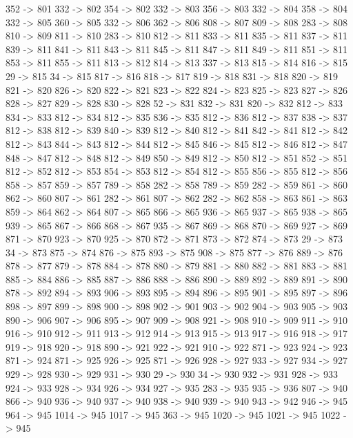 {	352 -> 801
	332 -> 802
	354 -> 802
	332 -> 803
	356 -> 803
	332 -> 804
	358 -> 804
	332 -> 805
	360 -> 805
	332 -> 806
	362 -> 806
	808 -> 807
	809 -> 808
	283 -> 808
	810 -> 809
	811 -> 810
	283 -> 810
	812 -> 811
	833 -> 811
	835 -> 811
	837 -> 811
	839 -> 811
	841 -> 811
	843 -> 811
	845 -> 811
	847 -> 811
	849 -> 811
	851 -> 811
	853 -> 811
	855 -> 811
	813 -> 812
	814 -> 813
	337 -> 813
	815 -> 814
	816 -> 815
	29 -> 815
	34 -> 815
	817 -> 816
	818 -> 817
	819 -> 818
	831 -> 818
	820 -> 819
	821 -> 820
	826 -> 820
	822 -> 821
	823 -> 822
	824 -> 823
	825 -> 823
	827 -> 826
	828 -> 827
	829 -> 828
	830 -> 828
	52 -> 831
	832 -> 831
	820 -> 832
	812 -> 833
	834 -> 833
	812 -> 834
	812 -> 835
	836 -> 835
	812 -> 836
	812 -> 837
	838 -> 837
	812 -> 838
	812 -> 839
	840 -> 839
	812 -> 840
	812 -> 841
	842 -> 841
	812 -> 842
	812 -> 843
	844 -> 843
	812 -> 844
	812 -> 845
	846 -> 845
	812 -> 846
	812 -> 847
	848 -> 847
	812 -> 848
	812 -> 849
	850 -> 849
	812 -> 850
	812 -> 851
	852 -> 851
	812 -> 852
	812 -> 853
	854 -> 853
	812 -> 854
	812 -> 855
	856 -> 855
	812 -> 856
	858 -> 857
	859 -> 857
	789 -> 858
	282 -> 858
	789 -> 859
	282 -> 859
	861 -> 860
	862 -> 860
	807 -> 861
	282 -> 861
	807 -> 862
	282 -> 862
	858 -> 863
	861 -> 863
	859 -> 864
	862 -> 864
	807 -> 865
	866 -> 865
	936 -> 865
	937 -> 865
	938 -> 865
	939 -> 865
	867 -> 866
	868 -> 867
	935 -> 867
	869 -> 868
	870 -> 869
	927 -> 869
	871 -> 870
	923 -> 870
	925 -> 870
	872 -> 871
	873 -> 872
	874 -> 873
	29 -> 873
	34 -> 873
	875 -> 874
	876 -> 875
	893 -> 875
	908 -> 875
	877 -> 876
	889 -> 876
	878 -> 877
	879 -> 878
	884 -> 878
	880 -> 879
	881 -> 880
	882 -> 881
	883 -> 881
	885 -> 884
	886 -> 885
	887 -> 886
	888 -> 886
	890 -> 889
	892 -> 889
	891 -> 890
	878 -> 892
	894 -> 893
	906 -> 893
	895 -> 894
	896 -> 895
	901 -> 895
	897 -> 896
	898 -> 897
	899 -> 898
	900 -> 898
	902 -> 901
	903 -> 902
	904 -> 903
	905 -> 903
	890 -> 906
	907 -> 906
	895 -> 907
	909 -> 908
	921 -> 908
	910 -> 909
	911 -> 910
	916 -> 910
	912 -> 911
	913 -> 912
	914 -> 913
	915 -> 913
	917 -> 916
	918 -> 917
	919 -> 918
	920 -> 918
	890 -> 921
	922 -> 921
	910 -> 922
	871 -> 923
	924 -> 923
	871 -> 924
	871 -> 925
	926 -> 925
	871 -> 926
	928 -> 927
	933 -> 927
	934 -> 927
	929 -> 928
	930 -> 929
	931 -> 930
	29 -> 930
	34 -> 930
	932 -> 931
	928 -> 933
	924 -> 933
	928 -> 934
	926 -> 934
	927 -> 935
	283 -> 935
	935 -> 936
	807 -> 940
	866 -> 940
	936 -> 940
	937 -> 940
	938 -> 940
	939 -> 940
	943 -> 942
	946 -> 945
	964 -> 945
	1014 -> 945
	1017 -> 945
	363 -> 945
	1020 -> 945
	1021 -> 945
	1022 -> 945
}
